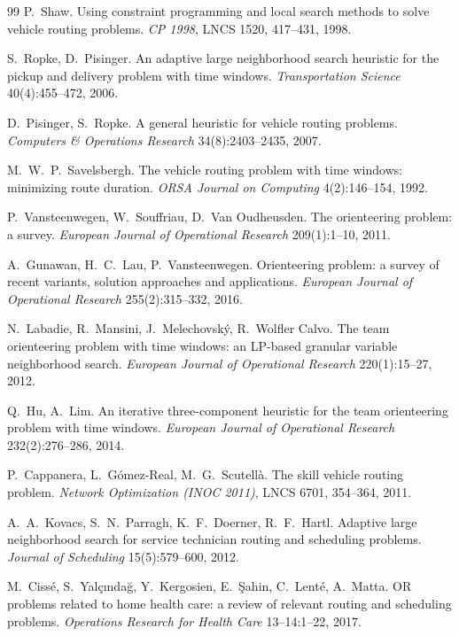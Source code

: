 \documentclass[10pt, a4paper]{article}
\begin{document}
\begin{thebibliography}{99}
 P.~Shaw.
Using constraint programming and local search methods to solve vehicle
routing problems. \emph{CP 1998}, LNCS 1520, 417--431, 1998.

 S.~Ropke, D.~Pisinger.
An adaptive large neighborhood search heuristic for the pickup and delivery
problem with time windows. \emph{Transportation Science} 40(4):455--472, 2006.

 D.~Pisinger, S.~Ropke.
A general heuristic for vehicle routing problems.
\emph{Computers \& Operations Research} 34(8):2403--2435, 2007.

 M.~W.~P.~Savelsbergh.
The vehicle routing problem with time windows: minimizing route duration.
\emph{ORSA Journal on Computing} 4(2):146--154, 1992.

 P.~Vansteenwegen, W.~Souffriau, D.~Van Oudheusden.
The orienteering problem: a survey.
\emph{European Journal of Operational Research} 209(1):1--10, 2011.

 A.~Gunawan, H.~C.~Lau, P.~Vansteenwegen.
Orienteering problem: a survey of recent variants, solution approaches and
applications. \emph{European Journal of Operational Research}
255(2):315--332, 2016.

 N.~Labadie, R.~Mansini, J.~Melechovsk\'y,
R.~Wolfler Calvo. The team orienteering problem with time windows: an
LP-based granular variable neighborhood search.
\emph{European Journal of Operational Research} 220(1):15--27, 2012.

 Q.~Hu, A.~Lim.
An iterative three-component heuristic for the team orienteering problem
with time windows. \emph{European Journal of Operational Research}
232(2):276--286, 2014.

 P.~Cappanera, L.~G\'omez-Real, M.~G.~Scutell\`a.
The skill vehicle routing problem. \emph{Network Optimization (INOC 2011)},
LNCS 6701, 354--364, 2011.

 A.~A.~Kovacs, S.~N.~Parragh, K.~F.~Doerner,
R.~F.~Hartl. Adaptive large neighborhood search for service technician
routing and scheduling problems. \emph{Journal of Scheduling}
15(5):579--600, 2012.

 M.~Ciss\'e, S.~Yal\c{c}{\i}nda\u{g}, Y.~Kergosien,
E.~\c{S}ahin, C.~Lent\'e, A.~Matta. OR problems related to home health care:
a review of relevant routing and scheduling problems.
\emph{Operations Research for Health Care} 13--14:1--22, 2017.


\end{thebibliography}
\end{document}
